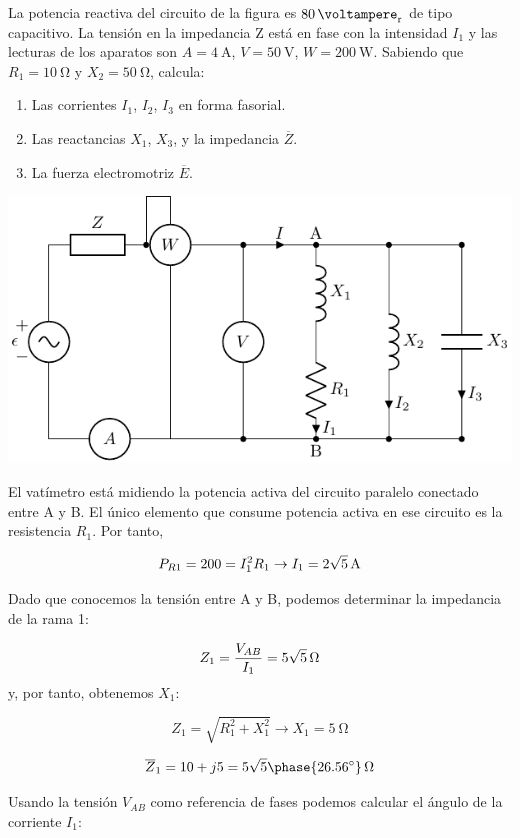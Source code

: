 \documentclass[12pt]{article}
\begin{document}
La potencia reactiva del circuito de la figura es $\SI{80}{\voltampere_r}$ de tipo capacitivo. La tensión en la impedancia Z está en fase con la intensidad $I_1$ y las lecturas de los aparatos son $A = \SI{4}{\ampere}$, $V = \SI{50}{\volt}$, $W = \SI{200}{\watt}$. Sabiendo que $R_1 = \SI{10}{\ohm}$ y $X_2 = \SI{50}{\ohm}$, calcula:

\begin{enumerate}
\item Las corrientes $I_1$, $I_2$, $I_3$ en forma fasorial.
\item Las reactancias $X_1$, $X_3$, y la impedancia $\overline{Z}$.
\item La fuerza electromotriz $\overline{E}$.
\end{enumerate}
\begin{center}
  \includegraphics{figs/problema12}
\end{center}

El vatímetro está midiendo la potencia activa del circuito paralelo conectado entre A y B. El único elemento que consume potencia activa en ese circuito es la resistencia $R_1$. Por tanto,

\[
  P_{R1} = 200 = I_1^2 R_1 \rightarrow I_1 = \SI[parse-numbers=false]{2\sqrt{5}}{\ampere}
\]

Dado que conocemos la tensión entre A y B, podemos determinar la impedancia de la rama 1:

\[
  Z_1 = \frac{V_{AB}}{I_1} = \SI[parse-numbers=false]{5\sqrt{5}}{\ohm}
\]
y, por tanto, obtenemos $X_1$:

\[
  Z_1 = \sqrt{R_1^2 + X_1^2} \rightarrow X_1 = \SI{5}{\ohm}
\]

\[
  \overline{Z}_1 = 10 + j5 = \SI[parse-numbers=false]{5\sqrt{5}\phase{\ang{26.56}}}{\ohm} 
\]

Usando la tensión $V_{AB}$ como referencia de fases podemos calcular el ángulo de la corriente $I_1$:
\end{document}
